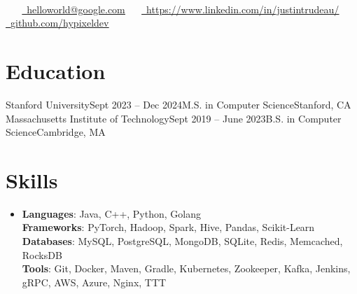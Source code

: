 \documentclass[letterpaper,11pt]{article}
\begin{document}
\vspace{12pt}
\begin{center}
  {
  \Huge \scshape {}} \\
  \vspace{6pt}
  \small
  \raisebox{-0.1\height}\faPhone\  ~ 
  \href{mailto:helloworld@google.com}{\raisebox{-0.2\height}\faEnvelope\  \underline{helloworld@google.com}} ~~
  \href{https://www.linkedin.com/in/justintrudeau/}{\raisebox{-0.2\height}\faLinkedin\ \underline{https://www.linkedin.com/in/justintrudeau/}}  ~
  \href{https://github.com/hypixeldev}{\raisebox{-0.2\height}\faGithub\ \underline{github.com/hypixeldev}}
  \vspace{-8pt}
\end{center}

\vspace{-7pt}
\section{Education}
\begin{itemize}[leftmargin=0.0in, label={}]
\educationSubheading
{Stanford University}{Sept 2023 -- Dec 2024}{M.S. in Computer Science}{Stanford, CA}
\vspace{-5pt}
\educationSubheading
{Massachusetts Institute of Technology}{Sept 2019 -- June 2023}{B.S. in Computer Science}{Cambridge, MA}
\end{itemize}
\vspace{-10pt}

\section{Skills}
\begin{itemize}[leftmargin=0.0in, label={}]
  \item{
        \textbf{Languages}{: Java, C++, Python, Golang} \\
        \textbf{Frameworks}{: PyTorch, Hadoop, Spark, Hive, Pandas, Scikit-Learn} \\
        \textbf{Databases}{: MySQL, PostgreSQL, MongoDB, SQLite, Redis, Memcached, RocksDB} \\
        \textbf{Tools}{: Git, Docker, Maven, Gradle, Kubernetes, Zookeeper, Kafka, Jenkins, gRPC, AWS, Azure, Nginx, TTT} \\
        }
\end{itemize}
\vspace{-14pt} %
\end{document}
